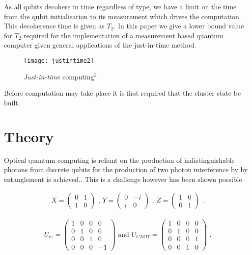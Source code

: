 \documentclass{article}
\numberwithin{equation}{section} %
\begin{document}
 As all qubits decohere in time regardless of type, we have a limit on the time from the qubit initialisation to its measurement which drives the computation. This decoherence time is given as $T_2$. In this paper we give a lower bound value for $T_2$ required for the implementation of a measurement based quantum computer given general applications of the just-in-time method.



\begin{figure}[h]
\begin{center}
\texttt{[image: justintime2]}
\caption{\emph{Just-in-time} computing$^5$}
\label{just}
\end{center}
\end{figure}
  
 Before computation may take place it is first required that the cluster state be built. 
 
 
 \section{Theory}
 
Optical quantum computing is reliant on the production of indistinguishable photons from discrete qubits for the production of two photon interference by by entanglement is achieved.. This is a challenge however has been shown possible. \cite{paris} 
 
 \begin{align*}
X =
\begin{pmatrix}
0 & 1 \\
1 & 0
\end{pmatrix}
\text{ , }
Y =
\begin{pmatrix}
0 & -i\\
i & 0
\end{pmatrix}
\text{ , }
Z =
\begin{pmatrix}
1 & 0 \\
0 & 1
\end{pmatrix}
\text{ .}
\end{align*}

 \begin{align*}
U_{cz} =
\begin{pmatrix}
1 & 0 & 0 & 0\\
0 & 1 & 0 & 0\\
0 & 0 & 1 & 0\\
0 & 0 & 0 & -1
\end{pmatrix}
\text{ and }
U_{CNOT} =
\begin{pmatrix}
1 & 0 & 0 & 0\\
0 & 1 & 0 & 0\\
0 & 0 & 0 & 1\\
0 & 0 & 1 & 0
\end{pmatrix}
\text{ .}
\end{align*}
           
\end{document}
